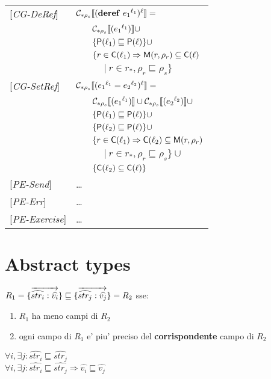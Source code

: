 \documentclass[[12pt,a4paper,twoside,openrigh]{article}
\newcommand{\lbt}[1]{{e_#1}^{\ell_#1}}
\begin{document}
\begin{tabular} {l l l l}
{[\textit{CG-DeRef}]}&\multicolumn{3}{l}{$\genl {\deref {\lbt 1}} = $}\\
&&\multicolumn{2}{l}{$ \gen {\lbt 1} \cup$}\\
&&\multicolumn{2}{l}{$\{ \mathsf{P}(\ell_1) \sqsubseteq \mathsf{P}(\ell) \} \cup$}\\
&&\multicolumn{2}{l}{$\{r \in \mathsf{C}(\ell_1) \Rightarrow \mathsf{M}(r, \rho_r) \subseteq \mathsf{C}(\ell)$} \\
&&&$|\ r \in r_*, \rho_r \sqsubseteq \rho_s\}$\\
{[\textit{CG-SetRef}]}&\multicolumn{3}{l}{$\genl {\setref {\lbt 1} {\lbt 2}} = $}\\
&&\multicolumn{2}{l}{$ \gen {\lbt 1} \cup \gen {\lbt 2} \cup $}\\
&&\multicolumn{2}{l}{$ \{ \mathsf{P}(\ell_1) \sqsubseteq \mathsf{P}(\ell) \} \cup$}\\
&&\multicolumn{2}{l}{$ \{ \mathsf{P}(\ell_2) \sqsubseteq \mathsf{P}(\ell) \} \cup$}\\
&&\multicolumn{2}{l}{$\{r \in \mathsf{C}(\ell_1) \Rightarrow \mathsf{C}(\ell_2) \subseteq \mathsf{M}(r, \rho_r)$}\\
&&&$|\ r \in r_*, \rho_r \sqsubseteq \rho_s\}\cup$ \\
&&\multicolumn{2}{l}{$\{ \mathsf{C}(\ell_2) \subseteq \mathsf{C}(\ell) \}$} \\
{[\textit{PE-Send}]}& \dots \\
{[\textit{PE-Err}]}& \dots \\
{[\textit{PE-Exercise}]}& \dots \\
\end{tabular}

\section{Abstract types}
\label{sec:abstractTy}
$ R_1=\{\overrightarrow{\widehat{str_i}:\widehat{v_i}}\} \sqsubseteq \{\overrightarrow{\widehat{str_j}:\widehat{v_j}}\}=R_2 $ sse:
\begin{enumerate}
\item $R_1$ ha meno campi di $R_2$
\item ogni campo di $R_1$ e' piu' preciso del \textbf{corrispondente} campo di $R_2$ 
\end{enumerate}

$\forall i, \exists j: \widehat{str_i} \sqsubseteq \widehat{str_j}$\\
$\forall i, \exists j: \widehat{str_i} \sqsubseteq \widehat{str_j} \Rightarrow \widehat{v_i} \sqsubseteq \widehat{v_j}$
\end{document}
